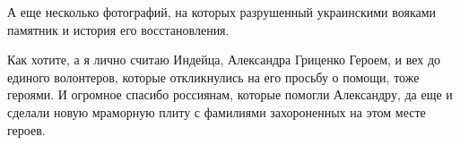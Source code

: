 А еще несколько фотографий, на которых разрушенный украинскими вояками памятник
и история его восстановления.


Как хотите, а я лично считаю Индейца, Александра Гриценко Героем, и вех до
единого волонтеров, которые откликнулись на его просьбу о помощи, тоже героями.
И огромное спасибо россиянам, которые помогли Александру, да еще и сделали
новую мраморную плиту с фамилиями захороненных на этом месте героев.


